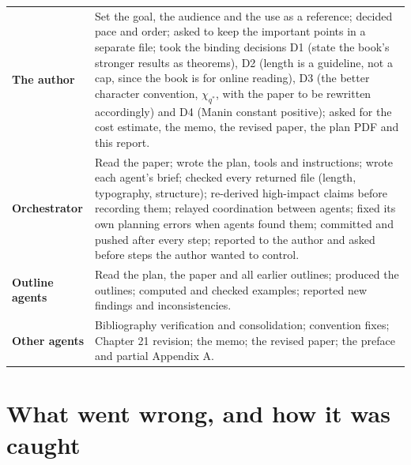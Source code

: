 \documentclass[11pt]{article}
\begin{document}
{\small
\begin{xltabular}{\linewidth}{>{\bfseries}p{2.6cm}L}
\toprule
The author & Set the goal, the audience and the use as a reference; decided pace and order; asked to keep the
important points in a separate file; took the binding decisions D1 (state the book's stronger results as
theorems), D2 (length is a guideline, not a cap, since the book is for online reading), D3 (the better character
convention, $\chi_{q^*}$, with the paper to be rewritten accordingly) and D4 (Manin constant positive); asked for
the cost estimate, the memo, the revised paper, the plan PDF and this report.\\
Orchestrator & Read the paper; wrote the plan, tools and instructions; wrote each agent's brief; checked every
returned file (length, typography, structure); re-derived high-impact claims before recording them; relayed
coordination between agents; fixed its own planning errors when agents found them; committed and pushed after
every step; reported to the author and asked before steps the author wanted to control.\\
Outline agents & Read the plan, the paper and all earlier outlines; produced the outlines; computed and checked
examples; reported new findings and inconsistencies.\\
Other agents & Bibliography verification and consolidation; convention fixes; Chapter 21 revision; the memo; the
revised paper; the preface and partial Appendix A.\\
\bottomrule
\end{xltabular}
}

\section{What went wrong, and how it was caught}
\end{document}
